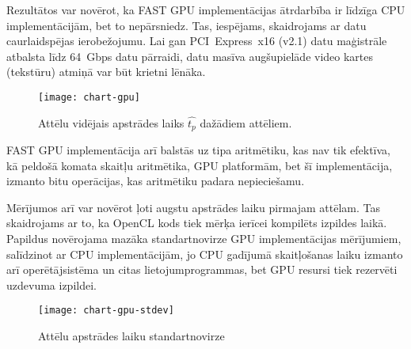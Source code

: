 Rezultātos var novērot, ka FAST GPU implementācijas ātrdarbība ir līdzīga
CPU implementācijām, bet to nepārsniedz. Tas, iespējams, skaidrojams ar 
datu caurlaidspējas ierobežojumu. Lai gan PCI~Express~x16 (v2.1) datu
maģistrāle atbalsta līdz 64~Gbps datu pārraidi, datu masīva augšupielāde
video kartes (tekstūru) atmiņā var būt krietni lēnāka.
\begin{figure}[t]
	\centering
	\texttt{[image: chart-gpu]}
	\caption{Attēlu vidējais apstrādes laiks $\hat{t_p}$ dažādiem attēliem.}
	\label{fig:test2-data}
\end{figure}
FAST GPU implementācija arī balstās uz  tipa aritmētiku, kas
nav tik efektīva, kā peldošā komata skaitļu aritmētika, GPU platformām, bet
šī implementācija, izmanto bitu operācijas, kas 
aritmētiku padara nepieciešamu.

Mērījumos arī var novērot ļoti augstu apstrādes laiku pirmajam attēlam. Tas
skaidrojams ar to, ka OpenCL kods tiek mērķa ierīcei kompilēts izpildes
laikā. 
Papildus novērojama mazāka standartnovirze GPU implementācijas mērījumiem,
salīdzinot ar CPU implementācijām, jo CPU gadījumā skaitļošanas laiku
izmanto arī operētājsistēma un citas lietojumprogrammas, bet GPU resursi
tiek rezervēti uzdevuma izpildei.

\begin{figure}[bh]
	\centering
	\texttt{[image: chart-gpu-stdev]}
	\caption{Attēlu apstrādes laiku standartnovirze}
	\label{fig:test2-stdev}
\end{figure}
